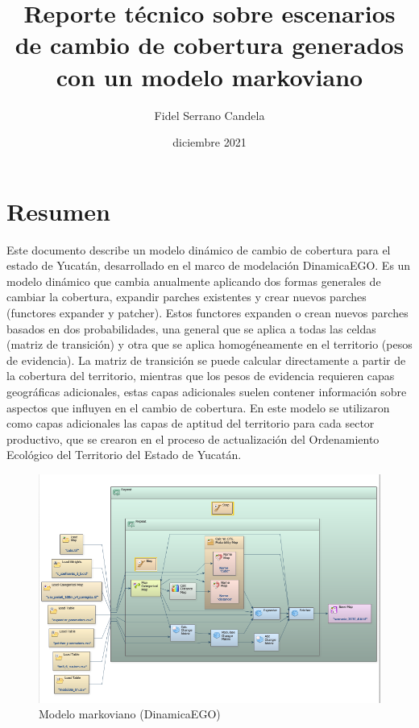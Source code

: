 \documentclass[12pt,a4paper,oldfontcommands]{article}
\title{Reporte técnico sobre escenarios de cambio de cobertura generados con un modelo markoviano}
\author{Fidel Serrano Candela}
\date{diciembre 2021}
\begin{document}
\maketitle
\tableofcontents
\pagebreak

\section{Resumen}

Este documento describe un modelo dinámico de cambio de cobertura para el estado de Yucatán, desarrollado en el marco de modelación DinamicaEGO. Es un modelo dinámico que cambia anualmente aplicando dos formas generales de cambiar la cobertura, expandir parches existentes y crear nuevos parches (functores expander y patcher). Estos functores expanden o crean nuevos parches basados en dos probabilidades, una general que se aplica a todas las celdas (matriz de transición) y otra que se aplica homogéneamente en el territorio (pesos de evidencia). La matriz de transición se puede calcular directamente a partir de la cobertura del territorio, mientras que los pesos de evidencia requieren capas geográficas adicionales, estas capas adicionales suelen contener información sobre aspectos que influyen en el cambio de cobertura. En este modelo se utilizaron como capas adicionales las capas de aptitud del territorio para cada sector productivo, que se crearon en el proceso de actualización del Ordenamiento Ecológico del Territorio del Estado de Yucatán. 

\begin{figure}[h]
	\centering
	\includegraphics[width=1\textwidth]{./figuras/modelo.png}
	\caption{Modelo markoviano (DinamicaEGO)}
\end{figure}
\end{document}
